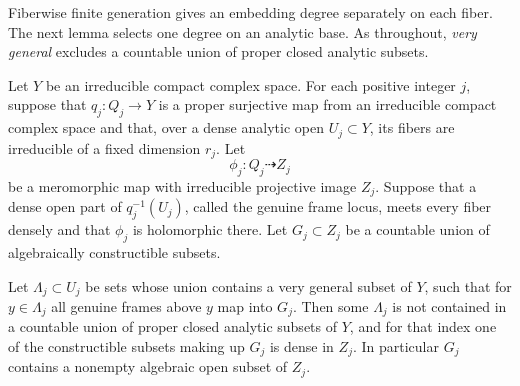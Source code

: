 Fiberwise finite generation gives an embedding degree separately on
each fiber.  The next lemma selects one degree on an analytic base.
As throughout, \emph{very general} excludes a countable union of proper
closed analytic subsets.

\begin{lemma}\label{generaltype:selection}
Let \(Y\) be an irreducible compact complex space.  For each positive integer
\(j\), suppose that \(q_j\colon Q_j\to Y\) is a proper surjective map from an
irreducible compact complex space and that, over a dense analytic open
\(U_j\subset Y\), its fibers are irreducible of a fixed dimension \(r_j\).
Let
\[
  \phi_j\colon Q_j\dashrightarrow Z_j
\]
be a meromorphic map with irreducible projective image \(Z_j\).
Suppose that a dense open part of \(q_j^{-1}(U_j)\), called the genuine
frame locus, meets every fiber densely and that \(\phi_j\) is holomorphic
there.  Let \(G_j\subset Z_j\) be a countable union of algebraically
constructible subsets.

Let \(\Lambda_j\subset U_j\) be sets whose union contains a very general
subset of \(Y\), such that for \(y\in\Lambda_j\) all genuine frames above
\(y\) map into \(G_j\).  Then some \(\Lambda_j\) is not contained in a
countable union of proper closed analytic subsets of \(Y\), and for
that index one of the constructible subsets making up \(G_j\) is dense
in \(Z_j\).  In particular \(G_j\) contains a nonempty algebraic open
subset of \(Z_j\).
\end{lemma}

